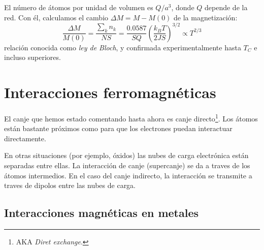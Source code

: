 \documentclass{tufte-book}
\newcommand{\sub}[1]{_{{\scriptscriptstyle\mathit{#1}}}}
\newcommand{\kb}{k\sub{B}}
\begin{document}
El número de átomos por unidad de volumen es $Q/a^3$, donde $Q$
depende de la red\footnotemark.
Con él, calculamos el cambio $ΔM = M-M(0)$ de la magnetización:
\begin{equation}
  \boxed{
  \frac{ΔM}{M(0)} = \frac{\sum_{k}n_k}{NS} = \frac{0.0587}{SQ} \left(
    \frac{\kb T}{2JS} \right)^{3/2} ∝ T^{2/3}
  }
\end{equation}
relación conocida como \emph{ley de Bloch}, y confirmada
experimentalmente hasta $T\sub{C}$ e incluso superiores.






\chapter{Interacciones ferromagnéticas}

El canje que hemos estado comentando hasta ahora es canje
directo\footnote{AKA \textit{Diret exchange}.}. Los átomos están
bastante próximos como para que los electrones puedan interactuar
directamente.

En otras situaciones (por ejemplo, óxidos) las nubes de carga
electrónica están separadas entre ellas. La interacción de canje
(supercanje) se da a traves de los átomos intermedios. En el caso del
canje indirecto, la interacción se transmite a traves de dipolos entre
las nubes de carga.

\section{Interacciones magnéticas en metales}
\end{document}
